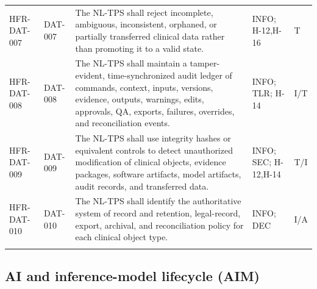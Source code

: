 \documentclass[11pt,letterpaper]{article}
\begin{document}
\begin{scriptsize}
\begin{longtable}{@{}L{0.14\textwidth}L{0.09\textwidth}L{0.47\textwidth}L{0.15\textwidth}L{0.07\textwidth}@{}}
\addlinespace[2pt]
\mbox{HFR-DAT-007} & \mbox{DAT-007} & The NL-TPS shall reject incomplete, ambiguous, inconsistent, orphaned, or partially transferred clinical data rather than promoting it to a valid state. & INFO; H-12,H-16 & T \\
\addlinespace[2pt]
\mbox{HFR-DAT-008} & \mbox{DAT-008} & The NL-TPS shall maintain a tamper-evident, time-synchronized audit ledger of commands, context, inputs, versions, evidence, outputs, warnings, edits, approvals, QA, exports, failures, overrides, and reconciliation events. & INFO; TLR; H-14 & I\slash\allowbreak{}T \\
\addlinespace[2pt]
\mbox{HFR-DAT-009} & \mbox{DAT-009} & The NL-TPS shall use integrity hashes or equivalent controls to detect unauthorized modification of clinical objects, evidence packages, software artifacts, model artifacts, audit records, and transferred data. & INFO; SEC; H-12,H-14 & T\slash\allowbreak{}I \\
\addlinespace[2pt]
\mbox{HFR-DAT-010} & \mbox{DAT-010} & The NL-TPS shall identify the authoritative system of record and retention, legal-record, export, archival, and reconciliation policy for each clinical object type. & INFO; DEC & I\slash\allowbreak{}A \\
\addlinespace[2pt]
\end{longtable}
\end{scriptsize}

\subsection{AI and inference-model lifecycle (AIM)}
\end{document}
